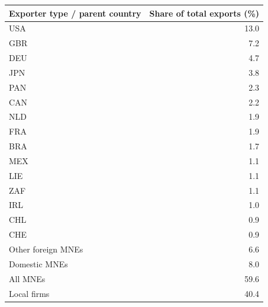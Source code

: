 \begin{tabular}{lr}
\toprule
Exporter type / parent country & Share of total exports (\%) \\
\midrule
USA & 13.0 \\
GBR & 7.2 \\
DEU & 4.7 \\
JPN & 3.8 \\
PAN & 2.3 \\
CAN & 2.2 \\
NLD & 1.9 \\
FRA & 1.9 \\
BRA & 1.7 \\
MEX & 1.1 \\
LIE & 1.1 \\
ZAF & 1.1 \\
IRL & 1.0 \\
CHL & 0.9 \\
CHE & 0.9 \\
Other foreign MNEs & 6.6 \\
Domestic MNEs & 8.0 \\
\midrule
All MNEs & 59.6 \\
Local firms & 40.4 \\
\bottomrule
\end{tabular}
